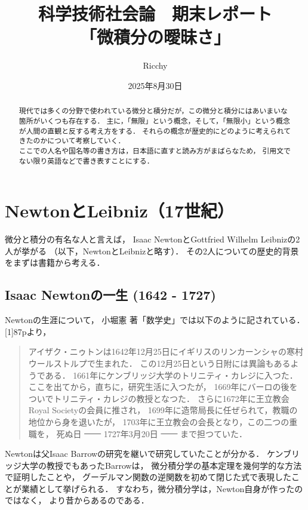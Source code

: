 \documentclass[11pt, a4paper]{jarticle}
\title{
	\textbf{
		科学技術社会論　期末レポート \\
		「微積分の曖昧さ」 \\
	}
}
\author{
	Ricchy \\ 
}
\date{
	2025年8月30日 \\
}
\theoremstyle{definition}
\begin{document}
	
	\maketitle
	
	\begin{abstract}
		現代では多くの分野で使われている微分と積分だが，この微分と積分にはあいまいな箇所がいくつも存在する．
		主に，「無限」という概念，そして，「無限小」という概念が人間の直観と反する考え方をする．
		それらの概念が歴史的にどのように考えられてきたのかについて考察していく． \\
		\quad
		ここでの人名や国名等の書き方は，日本語に直すと読み方がまばらなため，
		引用文でない限り英語などで書き表すことにする．
	\end{abstract}
	
	\section{NewtonとLeibniz（17世紀）}
		微分と積分の有名な人と言えば，
		Isaac NewtonとGottfried Wilhelm Leibnizの2人が挙がる
		（以下，NewtonとLeibnizと略す）．
		その2人についての歴史的背景をまずは書籍から考える．
		
		\subsection{Isaac Newtonの一生 (1642 - 1727)}
			Newtonの生涯について，
			小堀憲 著「数学史」では以下のように記されている．
			[1]87pより，
			\begin{quotation}
				アイザク・ニゥトンは1642年12月25日にイギリスのリンカーンシャの寒村ウールストルプで生まれた．
				この12月25日という日附には異論もあるようである．
				1661年にケンブリッジ大学のトリニティ・カレジに入つた．
				ここを出てから，直ちに，研究生活に入つたが，
				1669年にバーロの後をついでトリニティ・カレジの教授となつた．
				さらに1672年に王立教会Royal Societyの会員に推され，
				1699年に造幣局長に任ぜられて，教職の地位から身を退いたが，
				1703年に王立教会の会長となり，この二つの重職を，
				死ぬ日 \sout{　　} 1727年3月20日 \sout{　　} まで担つていた．
			\end{quotation}
			Newtonは父Isaac Barrowの研究を継いで研究していたことが分かる．
			ケンブリッジ大学の教授でもあったBarrowは，
			微分積分学の基本定理を幾何学的な方法で証明したことや，
			グーデルマン関数の逆関数を初めて閉じた式で表現したことが業績として挙げられる．
			すなわち，微分積分学は，Newton自身が作ったのではなく，
			より昔からあるのである．
			
\end{document}
